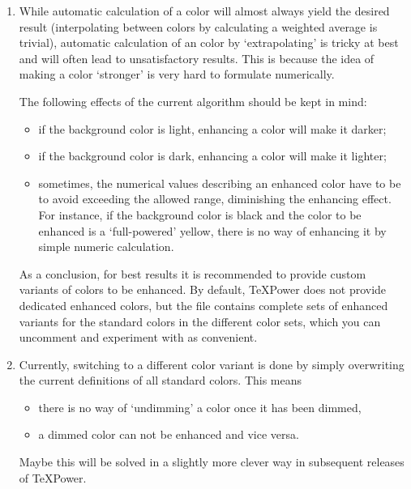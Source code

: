 \documentclass[12pt]{scrartcl}
\let\newslide=\relax
\begin{document}
  \begin{enumerate}
  \item While automatic calculation of a  color will almost always yield the desired result
    (interpolating between colors by calculating a weighted average is trivial), automatic calculation of an
     color by `extrapolating' is tricky at best and will often lead to unsatisfactory results. This is
    because the idea of making a color `stronger' is very hard to formulate numerically.

    \newslide

    The following effects of the current algorithm should be kept in mind:
    \begin{itemize}
    \item if the background color is light, enhancing a color will make it darker;
    \item if the background color is dark, enhancing a color will make it lighter;
    \item sometimes, the numerical values describing an enhanced color have to be  to avoid exceeding
      the allowed range, diminishing the enhancing effect. For instance, if the background color is black and the color
      to be enhanced is a `full-powered' yellow, there is no way of enhancing it by simple numeric calculation.
    \end{itemize}

    \newslide

    As a conclusion, for best results it is recommended to provide custom  variants of colors to be enhanced. By
    default, \TeX Power does not provide dedicated enhanced colors, but the file  contains complete
    sets of enhanced variants for the standard colors in the different color sets, which you can uncomment and
    experiment with as convenient.

    \newslide

  \item Currently, switching to a different color variant is done by simply overwriting the current definitions of all
    standard colors. This means
    \begin{itemize}
    \item there is no way of `undimming' a color once it has been dimmed,
    \item a dimmed color can not be enhanced and vice versa.
    \end{itemize}
    Maybe this will be solved in a slightly more clever way in subsequent releases of \TeX Power.


\end{enumerate}
\end{document}
